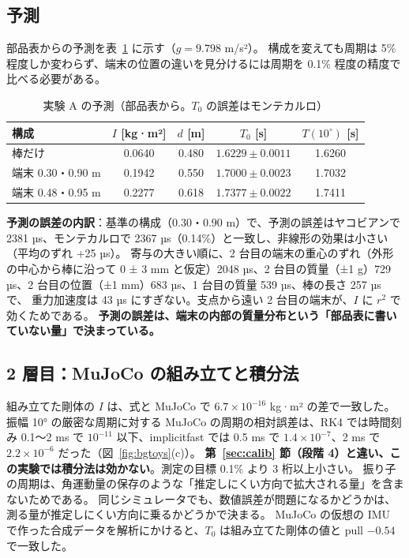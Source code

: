 \documentclass[paper=a4paper,fontsize=10pt,twocolumn,column_gap=2zw,line_length=24zw,number_of_lines=46,head_space=20mm]{jlreq}
\begin{document}
\subsection{予測}

部品表からの予測を表~\ref{tab:bgpred} に示す（$g=9.798$ m/s²）。
構成を変えても周期は 5\% 程度しか変わらず、端末の位置の違いを見分けるには周期を 0.1\% 程度の精度で比べる必要がある。

\begin{table}[t]\centering\footnotesize
\caption{実験 A の予測（部品表から。$T_0$ の誤差はモンテカルロ）}\label{tab:bgpred}
\setlength{\tabcolsep}{2pt}
\begin{tabular}{lcccc}\toprule
構成 & $I$ [kg·m²] & $d$ [m] & $T_0$ [s] & $T(10^\circ)$ [s] \\\midrule
棒だけ & 0.0640 & 0.480 & $1.6229\pm0.0011$ & 1.6260 \\
端末 0.30・0.90 m & 0.1942 & 0.550 & $1.7000\pm0.0023$ & 1.7032 \\
端末 0.48・0.95 m & 0.2277 & 0.618 & $1.7377\pm0.0022$ & 1.7411 \\\bottomrule
\end{tabular}
\end{table}

\textbf{予測の誤差の内訳}：基準の構成（0.30・0.90 m）で、予測の誤差はヤコビアンで 2381 µs、モンテカルロで 2367 µs（0.14\%）と一致し、非線形の効果は小さい（平均のずれ +25 µs）。
寄与の大きい順に、2 台目の端末の重心のずれ（外形の中心から棒に沿って 0 ± 3 mm と仮定）2048 µs、2 台目の質量（±1 g）729 µs、2 台目の位置（±1 mm）683 µs、1 台目の質量 539 µs、棒の長さ 257 µs で、
重力加速度は 43 µs にすぎない。支点から遠い 2 台目の端末が、$I$ に $r^2$ で効くためである。
\textbf{予測の誤差は、端末の内部の質量分布という「部品表に書いていない量」で決まっている。}

\subsection{2 層目：MuJoCo の組み立てと積分法}

組み立てた剛体の $I$ は、式と MuJoCo で $6.7\times10^{-16}$ kg·m² の差で一致した。
振幅 10° の厳密な周期に対する MuJoCo の周期の相対誤差は、RK4 では時間刻み 0.1〜2 ms で $10^{-11}$ 以下、implicitfast では 0.5 ms で $1.4\times10^{-7}$、2 ms で $2.2\times10^{-6}$ だった（図~\ref{fig:bgtoys}(c)）。
\textbf{第~\ref{sec:calib} 節（段階 4）と違い、この実験では積分法は効かない}。測定の目標 0.1\% より 3 桁以上小さい。
振り子の周期は、角運動量の保存のような「推定しにくい方向で拡大される量」を含まないためである。
同じシミュレータでも、数値誤差が問題になるかどうかは、測る量が推定しにくい方向に乗るかどうかで決まる。
MuJoCo の仮想の IMU で作った合成データを解析にかけると、$T_0$ は組み立てた剛体の値と pull $-0.54$ で一致した。
\end{document}
